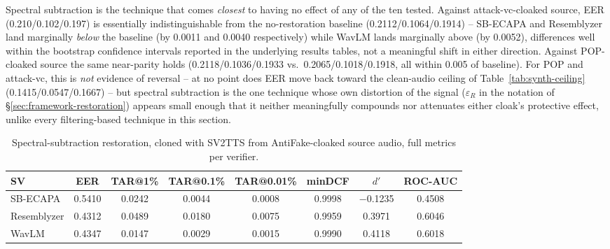 \documentclass[11pt]{article}
\begin{document}
Spectral subtraction is the technique that comes \emph{closest} to
having no effect of any of the ten tested. Against attack-vc-cloaked
source, EER (0.210/0.102/0.197) is essentially indistinguishable from
the no-restoration baseline (0.2112/0.1064/0.1914) -- SB-ECAPA and
Resemblyzer land marginally \emph{below} the baseline (by 0.0011 and
0.0040 respectively) while WavLM lands marginally above (by 0.0052),
differences well within the bootstrap confidence intervals reported in
the underlying results tables, not a meaningful shift in either
direction. Against POP-cloaked source the same near-parity holds
(0.2118/0.1036/0.1933 vs.\ 0.2065/0.1018/0.1918, all within 0.005 of
baseline). For POP and attack-vc, this is \emph{not} evidence of reversal -- at no
point does EER move back toward the clean-audio ceiling of
Table~\ref{tab:synth-ceiling} (0.1415/0.0547/0.1667) -- but spectral
subtraction is the one technique whose own distortion of the signal
($\varepsilon_R$ in the notation of \S\ref{sec:framework-restoration})
appears small enough that it neither meaningfully compounds nor
attenuates either cloak's protective effect, unlike every
filtering-based technique in this section.

\begin{table}[H]
\centering
\caption{Spectral-subtraction restoration, cloned with SV2TTS from
AntiFake-cloaked source audio, full metrics per verifier.}
\label{tab:restoration-spectral-antifake-results}
\begin{tabular}{lccccccc}
\toprule
SV & EER & TAR@1\% & TAR@0.1\% & TAR@0.01\% & minDCF & $d'$ & ROC-AUC \\
\midrule
SB-ECAPA    & 0.5410 & 0.0242 & 0.0044 & 0.0008 & 0.9998 & $-$0.1235 & 0.4508 \\
Resemblyzer & 0.4312 & 0.0489 & 0.0180 & 0.0075 & 0.9959 & 0.3971 & 0.6046 \\
WavLM       & 0.4347 & 0.0147 & 0.0029 & 0.0015 & 0.9990 & 0.4118 & 0.6018 \\
\bottomrule
\end{tabular}
\end{table}
\end{document}
